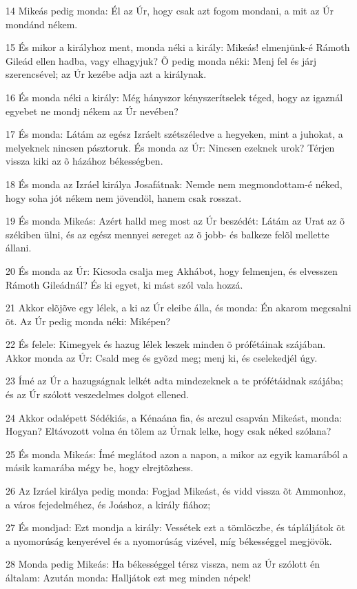 \par 14 Mikeás pedig monda: Él az Úr, hogy csak azt fogom mondani, a mit az Úr mondánd nékem.
\par 15 És mikor a királyhoz ment, monda néki a király: Mikeás! elmenjünk-é Rámoth Gileád ellen hadba, vagy elhagyjuk? Õ pedig monda néki: Menj fel és járj szerencsével; az Úr kezébe adja azt a királynak.
\par 16 És monda néki a király: Még hányszor kényszerítselek téged, hogy az igaznál egyebet ne mondj nékem az Úr nevében?
\par 17 És monda: Látám az egész Izráelt szétszéledve a hegyeken, mint a juhokat, a melyeknek nincsen pásztoruk. És monda az Úr: Nincsen ezeknek urok? Térjen vissza kiki az õ házához békességben.
\par 18 És monda az Izráel királya Josafátnak: Nemde nem megmondottam-é néked, hogy soha jót nékem nem jövendöl, hanem csak rosszat.
\par 19 És monda Mikeás: Azért halld meg most az Úr beszédét: Látám az Urat az õ székiben ülni, és az egész mennyei sereget az õ jobb- és balkeze felõl mellette állani.
\par 20 És monda az Úr: Kicsoda csalja meg Akhábot, hogy felmenjen, és elvesszen Rámoth Gileádnál? És ki egyet, ki mást szól vala hozzá.
\par 21 Akkor elõjõve egy lélek, a ki az Úr eleibe álla, és monda: Én akarom megcsalni õt. Az Úr pedig monda néki: Miképen?
\par 22 És felele: Kimegyek és hazug lélek leszek minden õ prófétáinak szájában. Akkor monda az Úr: Csald meg és gyõzd meg; menj ki, és cselekedjél úgy.
\par 23 Ímé az Úr a hazugságnak lelkét adta mindezeknek a te prófétáidnak szájába; és az Úr szólott veszedelmes dolgot ellened.
\par 24 Akkor odalépett Sédékiás, a Kénaána fia, és arczul csapván Mikeást, monda: Hogyan? Eltávozott volna én tõlem az Úrnak lelke, hogy csak néked szólana?
\par 25 És monda Mikeás: Ímé meglátod azon a napon, a mikor az egyik kamarából a másik kamarába mégy be, hogy elrejtõzhess.
\par 26 Az Izráel királya pedig monda: Fogjad Mikeást, és vidd vissza õt Ammonhoz, a város fejedelméhez, és Joáshoz, a király fiához;
\par 27 És mondjad: Ezt mondja a király: Vessétek ezt a tömlöczbe, és tápláljátok õt a nyomorúság kenyerével és a nyomorúság vizével, míg békességgel megjövök.
\par 28 Monda pedig Mikeás: Ha békességgel térsz vissza, nem az Úr szólott én általam: Azután monda: Halljátok ezt meg minden népek!
